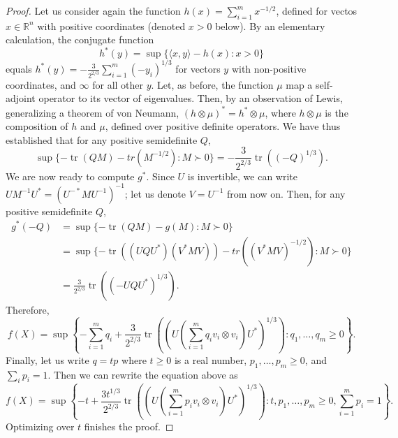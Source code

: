 \documentclass{article}
\newcommand{\R}{{\mathbb{R}}}
\DeclareMathOperator{\tr}{tr}
\begin{document}
{\begin{proof}
  Let us consider again the function $h(x) = \sum_{i =
    1}^m{x^{-1/2}}$, defined for vectos $x \in \R^n$ with positive
  coordinates (denoted $x > 0$ below). By an elementary calculation,
  the conjugate function
  \[
  h^*(y) = \sup\{\langle x, y \rangle - h(x): x >0\}
  \]
  equals $h^*(y) = -\frac{3}{2^{2/3}} \sum_{i = 1}^m{(-y_i)^{1/3}}$ for
  vectors $y$ with non-positive coordinates, and $\infty$ for all other
  $y$. Let, as before, the function $\mu$ map a self-adjoint operator
  to its vector of eigenvalues. Then, by an observation of Lewis,
  generalizing a theorem of von Neumann, $(h\otimes \mu)^* = h^*
  \otimes \mu$, where $h\otimes \mu$ is the composition of $h$ and
  $\mu$, defined over positive definite operators. We have thus
  established that for any positive semidefinite $Q$, 
  \[
  \sup\{-\tr(QM) - tr(M^{-1/2}): M \succ 0\}
  = 
 -\frac{3}{2^{2/3}} \tr((-Q)^{1/3}). 
  \]
  We are now ready to compute $g^*$. Since $U$ is invertible, we can
  write $UM^{-1}U^* = (U^{-*}MU^{-1})^{-1}$; let us denote $V =
  U^{-1}$ from now on. Then, for any positive semidefinite $Q$,
  \begin{align*}
    g^*(-Q) &= \sup\{ -\tr(QM) - g(M): M \succ 0\}\\
    &= \sup\{ -\tr((UQU^*)(V^*MV)) - tr((V^*MV)^{-1/2}): M \succ 0\}\\
    &=  \frac{3}{2^{2/3}} \tr((-UQU^*)^{1/3}). 
  \end{align*}
  Therefore,
  \[
  f(X) = \sup\left\{-\sum_{i = 1}^m{q_i} 
    + \frac{3}{2^{2/3}} \tr((U(\sum_{i = 1}^m{q_i  v_i\otimes v_i})U^*)^{1/3}):
    q_1, \ldots, q_m \ge 0\right\}.
  \]
  Finally, let us write $q = tp$ where $t \ge 0$ is a real number,
  $p_1, \ldots, p_m \ge 0$, and $\sum_i p_i = 1$. Then we can rewrite
  the equation above as
  \[
  f(X) = \sup\left\{-t
    + \frac{3t^{1/3}}{2^{2/3}} \tr((U(\sum_{i = 1}^m{p_i  v_i\otimes v_i})U^*)^{1/3}):
    t, p_1, \ldots, p_m \ge 0, \sum_{i=1}^m p_i = 1\right\}.
  \]
  Optimizing over $t$ finishes the proof. 
\end{proof}

}
\end{document}

